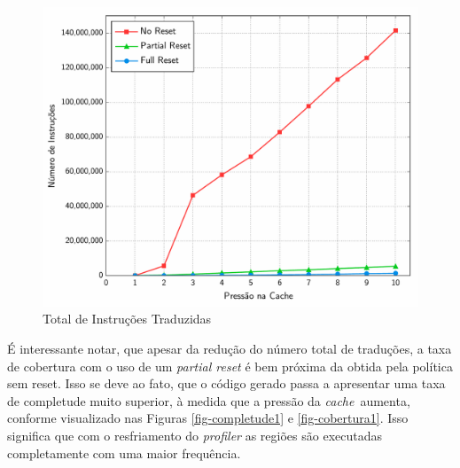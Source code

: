 \documentclass[11pt,twoside]{article}
\newcommand{\cache}{\emph{cache}}
\begin{document}
\begin{figure}[!ht]
	\centering
\includegraphics[scale=0.4]{./figs/reset-translate-inst}
\caption{Total de Instruções Traduzidas}
\label{fig-reset-trans}
\end{figure}


É interessante notar, que apesar da redução do número total de traduções, a taxa de cobertura com o uso de um \emph{partial reset} é bem próxima da obtida pela política sem reset. Isso se deve ao fato, que o código gerado passa a apresentar uma taxa de completude muito superior, à medida que a pressão da \cache~aumenta, conforme visualizado nas Figuras \ref{fig-completude1} e \ref{fig-cobertura1}. Isso significa que com o resfriamento do \emph{profiler} as regiões são executadas completamente com uma maior frequência.
\end{document}

